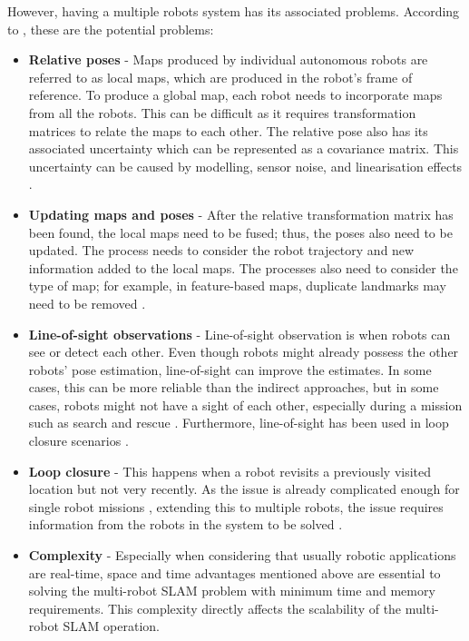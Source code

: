 However, having a multiple robots system has its associated problems. According to \cite{Saeedi}, these are the potential problems:
\begin{itemize}
    \item \textbf{Relative poses} - Maps produced by individual autonomous robots are referred to as local maps, which are produced in the robot's frame of reference. To produce a global map, each robot needs to incorporate maps from all the robots. This can be difficult as it requires transformation matrices to relate the maps to each other. The relative pose also has its associated uncertainty which can be represented as a covariance matrix. This uncertainty can be caused by modelling, sensor noise, and linearisation effects \cite{Thrun2006}. 
    \item \textbf{Updating maps and poses} - After the relative transformation matrix has been found, the local maps need to be fused; thus, the poses also need to be updated. The process needs to consider the robot trajectory and new information added to the local maps. The processes also need to consider the type of map; for example, in feature-based maps, duplicate landmarks may need to be removed \cite{Siegwart2004}.
    \item \textbf{Line-of-sight observations} - Line-of-sight observation is when robots can see or detect each other. Even though robots might already possess the other robots' pose estimation, line-of-sight can improve the estimates.  In some cases, this can be more reliable than the indirect approaches, but in some cases, robots might not have a sight of each other, especially during a mission such as search and rescue \cite{DeHoog2009}. Furthermore, line-of-sight has been used in loop closure scenarios \cite{Matari2004}.
    \item \textbf{Loop closure} - This happens when a robot revisits a previously visited location but not very recently. As the issue is already complicated enough for single robot missions \cite{Balcilar2016}, extending this to multiple robots, the issue requires information from the robots in the system to be solved \cite{Howard2006a}.
    \item \textbf{Complexity} - Especially when considering that usually robotic applications are real-time, space and time advantages mentioned above are essential to solving the multi-robot SLAM problem with minimum time and memory requirements. This complexity directly affects the scalability of the multi-robot SLAM operation.

\end{itemize}
